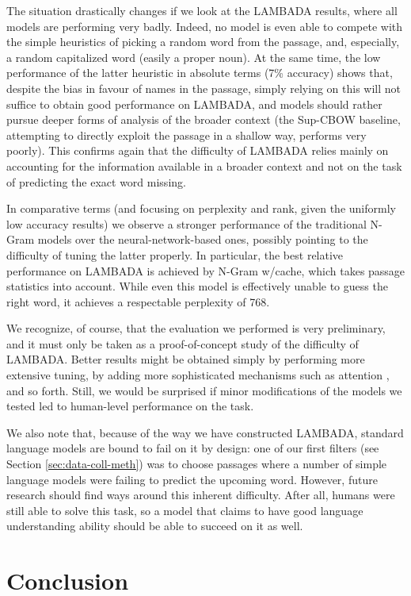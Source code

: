 The situation drastically changes if we look at the LAMBADA results, where all models are performing very badly. Indeed, no model is even able to compete with the simple heuristics of picking a random word from the passage, and, especially, a random capitalized word (easily a proper noun). At the same time, the low performance of the latter heuristic in absolute terms (7\% accuracy) shows that, despite the bias in favour of names in the passage, simply relying on this will not suffice to obtain good performance on LAMBADA, and models should rather pursue deeper forms of analysis of the broader context (the Sup-CBOW baseline, attempting to directly exploit the passage in a shallow way, performs very poorly).  This confirms again that the difficulty of LAMBADA relies mainly on accounting for the information available in a broader context and not on the task of predicting the exact word missing.

In comparative terms (and focusing on perplexity and rank, given the uniformly low accuracy results) we observe a stronger performance of the traditional N-Gram models over the neural-network-based ones, possibly pointing to the difficulty of tuning the latter properly. In particular, the best relative performance on LAMBADA is achieved by N-Gram w/cache, which takes passage statistics into account. While even this model is effectively unable to guess the right word, it achieves a respectable perplexity of 768.

We recognize, of course, that the evaluation we performed is very preliminary, and it must only be taken as a proof-of-concept study of the difficulty of LAMBADA. Better results might be obtained simply by performing more extensive tuning, by adding more sophisticated mechanisms such as attention \cite{Bahdanau:2014}, and so forth. Still, we would be surprised if minor modifications of the models we tested led to human-level performance on the task. 

We also note that, because of the way we have constructed LAMBADA, standard language models are bound to fail on it by design: one of our first filters (see Section \ref{sec:data-coll-meth}) was to choose passages where a number of simple language models were failing to predict the upcoming word. However, future research should find ways around this inherent difficulty. After all, humans were still able to solve this task, so a model that claims to have good language understanding ability should be able to succeed on it as well.

\section{Conclusion}
\label{sec:conclusions}

